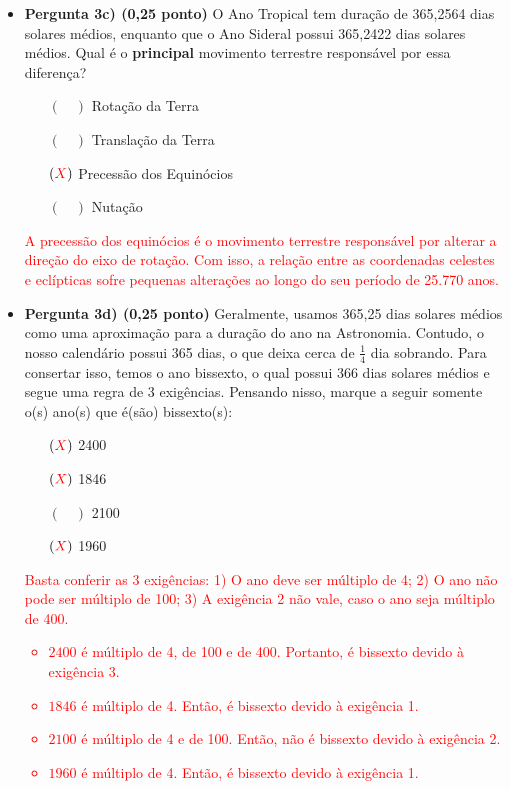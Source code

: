 \documentclass[a4paper, 12pt]{article}
\begin{document}
\begin{flushleft}
\begin{itemize}
\begin{itemize}
				\item \textbf{Pergunta 3c) (0,25 ponto)} O Ano Tropical tem duração de 365,2564 dias solares médios, enquanto que o Ano Sideral possui 365,2422 dias solares médios. Qual é o \textbf{principal} movimento terrestre responsável por essa diferença?
					\begin{itemize}
						\item[$(\quad)$] Rotação da Terra
						\item[$(\quad)$] Translação da Terra
						\item[$(\textcolor{red}{X})$] Precessão dos Equinócios
						\item[$(\quad)$] Nutação
					\end{itemize}
					\textcolor{red}{A precessão dos equinócios é o movimento terrestre responsável por alterar a direção do eixo de rotação. Com isso, a relação entre as coordenadas celestes e eclípticas sofre pequenas alterações ao longo do seu período de 25.770 anos.}
				\item \textbf{Pergunta 3d) (0,25 ponto)} Geralmente, usamos 365,25 dias solares médios como uma aproximação para a duração do ano na Astronomia. Contudo, o nosso calendário possui 365 dias, o que deixa cerca de $\frac{1}{4}$ dia sobrando. Para consertar isso, temos o ano bissexto, o qual possui 366 dias solares médios e segue uma regra de 3 exigências. Pensando nisso, marque a seguir somente o(s) ano(s) que é(são) bissexto(s):
					\begin{itemize}
						\item[$(\textcolor{red}{X})$] 2400
						\item[$(\textcolor{red}{X})$] 1846
						\item[$(\quad)$] 2100
						\item[$(\textcolor{red}{X})$] 1960
					\end{itemize}
					\textcolor{red}{Basta conferir as 3 exigências: 1) O ano deve ser múltiplo de 4; 2) O ano não pode ser múltiplo de 100; 3) A exigência 2 não vale, caso o ano seja múltiplo de 400.}
					\textcolor{red}
					{
						\begin{itemize}
							\item $2400$ é múltiplo de 4, de 100 e de 400. Portanto, é bissexto devido à exigência 3.
							\item $1846$ é múltiplo de 4. Então, é bissexto devido à exigência 1.
							\item $2100$ é múltiplo de 4 e de 100. Então, não é bissexto devido à exigência 2.
							\item $1960$ é múltiplo de 4. Então, é bissexto devido à exigência 1.
						\end{itemize}
					}
			\end{itemize}
		

\end{itemize}
\end{flushleft}
\end{document}
